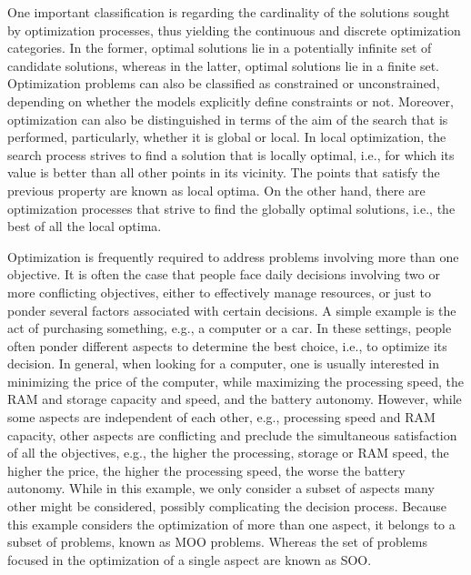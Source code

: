	One important classification is regarding the cardinality of the solutions sought by optimization processes, thus yielding the continuous and discrete optimization categories. In the former, optimal solutions lie in a potentially infinite set of candidate solutions, whereas in the latter, optimal solutions lie in a finite set. Optimization problems can also be classified as constrained or unconstrained, depending on whether the models explicitly define constraints or not. Moreover, optimization can also be distinguished in terms of the aim of the search that is performed, particularly, whether it is global or local. In local optimization, the search process strives to find a solution that is locally optimal, i.e., for which its value is better than all other points in its vicinity. The points that satisfy the previous property are known as local optima. On the other hand, there are optimization processes that strive to find the globally optimal solutions, i.e., the best of all the local optima.

	Optimization is frequently required to address problems involving more than one objective. It is often the case that people face daily decisions involving two or more conflicting objectives, either to effectively manage resources, or just to ponder several factors associated with certain decisions. A simple example is the act of purchasing something, e.g., a computer or a car. In these settings, people often ponder different aspects to determine the best choice, i.e., to optimize its decision. In general, when looking for a computer, one is usually interested in minimizing the price of the computer, while maximizing the processing speed, the RAM and storage capacity and speed, and the battery autonomy. However, while some aspects are independent of each other, e.g., processing speed and RAM capacity, other aspects are conflicting and preclude the simultaneous satisfaction of all the objectives, e.g., the higher the processing, storage or RAM speed, the higher the price, the higher the processing speed, the worse the battery autonomy. While in this example, we only consider a subset of aspects many other might be considered, possibly complicating the decision process.  Because this example considers the optimization of more than one aspect, it belongs to a subset of problems, known as \ac{MOO} problems. Whereas the set of problems focused in the optimization of a single aspect are known as \ac{SOO}.
	
